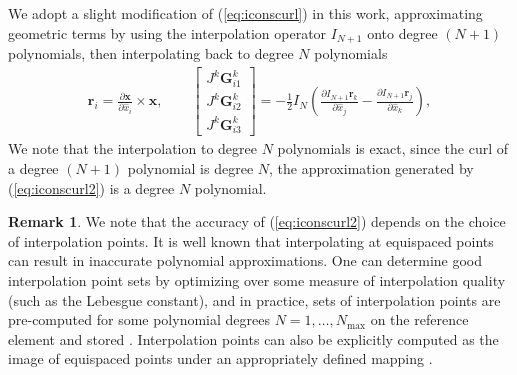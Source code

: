 \documentclass[preprint,10pt]{article}
\theoremstyle{definition}
\theoremstyle{lemma}
\newtheorem*{remark}{Remark}
\theoremstyle{theorem}
\theoremstyle{assumption}
\renewcommand{\hat}{\widehat}
\newcommand{\pd}[2]{\frac{\partial#1}{\partial#2}}
\newcommand{\LRp}[1]{\left( #1 \right)}
\newcommand{\LRs}[1]{\left[ #1 \right]}
\begin{document}
{We adopt a slight modification of (\ref{eq:iconscurl}) in this work, approximating geometric terms by using the interpolation operator $I_{N+1}$ onto degree $(N+1)$ polynomials, then interpolating back to degree $N$ polynomials 
\begin{align}
\bm{r}_i = { \pd{\bm{x}}{\hat{x}_i}\times \bm{x}}, \qquad 
\LRs{\begin{array}{c}
J^k\bm{G}^k_{i1}\\
J^k\bm{G}^k_{i2}\\
J^k\bm{G}^k_{i3}\end{array}} = -\frac{1}{2}I_{N}\LRp{\pd{I_{N+1}\bm{r}_k}{\hat{x}_j}-\pd{I_{N+1}\bm{r}_j}{\hat{x}_k}}, 
\label{eq:iconscurl2}
\end{align}
We note that the interpolation to degree $N$ polynomials is exact, since the curl of a degree $(N+1)$ polynomial is degree $N$, the approximation generated by (\ref{eq:iconscurl2}) is a degree $N$ polynomial.  

\begin{remark}
We note that the accuracy of (\ref{eq:iconscurl2}) depends on the choice of interpolation points.  It is well known that interpolating at equispaced points can result in inaccurate polynomial approximations.  One can determine good interpolation point sets by optimizing over some measure of interpolation quality (such as the Lebesgue constant), and in practice, sets of interpolation points are pre-computed for some polynomial degrees $N = 1,\ldots, N_{\max}$ on the reference element and stored \cite{chen1996optimal, hesthaven1998electrostatics}. Interpolation points can also be explicitly computed as the image of equispaced points under an appropriately defined mapping \cite{blyth2006lobatto, warburton2006explicit, chan2015comparison}.  
\end{remark}

}
\end{document}
